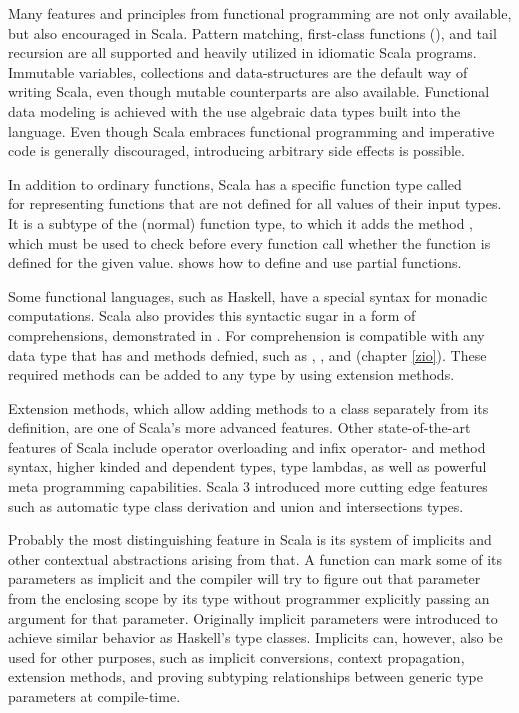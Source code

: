 Many features and principles from functional programming are not only available, but also encouraged in Scala. Pattern matching, first-class functions (), and tail recursion are all supported and heavily utilized in idiomatic Scala programs. Immutable variables, collections and data-structures are the default way of writing Scala, even though mutable counterparts are also available. Functional data modeling is achieved with the use algebraic data types built into the language. Even though Scala embraces functional programming and imperative code is generally discouraged, introducing arbitrary side effects is possible.



In addition to ordinary functions, Scala has a specific function type called \\ for representing functions that are not defined for all values of their input types. It is a subtype of the (normal) function type, to which it adds the method , which must be used to check before every function call whether the function is defined for the given value.  shows how to define and use partial functions.



Some functional languages, such as Haskell, have a special syntax for monadic computations. Scala also provides this syntactic sugar in a form of  comprehensions, demonstrated in . For comprehension is compatible with any data type that has  and  methods defnied, such as , , and  (chapter \ref{zio}). These required methods can be added to any type by using extension methods.

Extension methods, which allow adding methods to a class separately from its definition, are one of Scala's more advanced features. Other state-of-the-art features of Scala include operator overloading and infix operator- and method syntax, higher kinded and dependent types, type lambdas, as well as powerful meta programming capabilities. Scala 3 introduced more cutting edge features such as automatic type class derivation and union and intersections types.

Probably the most distinguishing feature in Scala is its system of implicits and other contextual abstractions arising from that. A function can mark some of its parameters as implicit and the compiler will try to figure out that parameter from the enclosing scope by its type without programmer explicitly passing an argument for that parameter. Originally implicit parameters were introduced to achieve similar behavior as Haskell's type classes. Implicits can, however, also be used for other purposes, such as implicit conversions, context propagation, extension methods, and proving subtyping relationships between generic type parameters at compile-time.~\cite{tc-as-objects}

